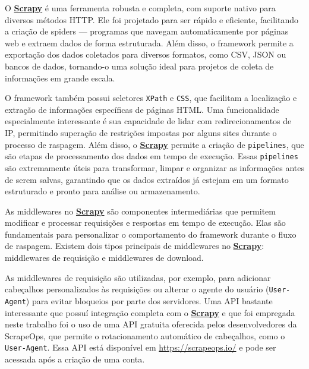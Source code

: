 \documentclass[
  12pt,
  a4paper,
]{scrreprt}
\begin{document}
\vspace{12pt}

O \href{https://docs.scrapy.org/en/latest}{\textbf{Scrapy}} é uma
ferramenta robusta e completa, com suporte nativo para diversos métodos
HTTP. Ele foi projetado para ser rápido e eficiente, facilitando a
criação de spiders --- programas que navegam automaticamente por páginas
web e extraem dados de forma estruturada. Além disso, o framework
permite a exportação dos dados coletados para diversos formatos, como
CSV, JSON ou bancos de dados, tornando-o uma solução ideal para projetos
de coleta de informações em grande escala.

\vspace{12pt}

O framework também possui seletores \texttt{XPath} e \texttt{CSS}, que
facilitam a localização e extração de informações específicas de páginas
HTML. Uma funcionalidade especialmente interessante é sua capacidade de
lidar com redirecionamentos de IP, permitindo superação de restrições
impostas por alguns sites durante o processo de raspagem. Além disso, o
\href{https://docs.scrapy.org/en/latest}{\textbf{Scrapy}} permite a
criação de \texttt{pipelines}, que são etapas de processamento dos dados
em tempo de execução. Essas \texttt{pipelines} são extremamente úteis
para transformar, limpar e organizar as informações antes de serem
salvas, garantindo que os dados extraídos já estejam em um formato
estruturado e pronto para análise ou armazenamento.

\vspace{12pt}

As middlewares no
\href{https://docs.scrapy.org/en/latest}{\textbf{Scrapy}} são
componentes intermediárias que permitem modificar e processar
requisições e respostas em tempo de execução. Elas são fundamentais para
personalizar o comportamento do framework durante o fluxo de raspagem.
Existem dois tipos principais de middlewares no
\href{https://docs.scrapy.org/en/latest}{\textbf{Scrapy}}: middlewares
de requisição e middlewares de download.

\vspace{12pt}

As middlewares de requisição são utilizadas, por exemplo, para adicionar
cabeçalhos personalizados às requisições ou alterar o agente do usuário
(\texttt{User-Agent}) para evitar bloqueios por parte dos servidores.
Uma API bastante interessante que possuí integração completa com o
\href{https://docs.scrapy.org/en/latest}{\textbf{Scrapy}} e que foi
empregada neste trabalho foi o uso de uma API gratuita oferecida pelos
desenvolvedores da ScrapeOps, que permite o rotacionamento automático de
cabeçalhos, como o \texttt{User-Agent}. Essa API está disponível em
\url{https://scrapeops.io/} e pode ser acessada após a criação de uma
conta.
\end{document}
